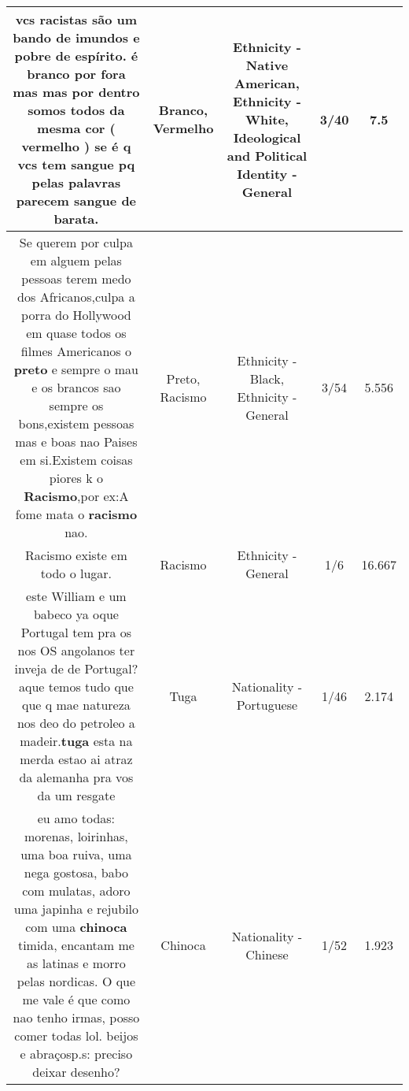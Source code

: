 \documentclass[11pt]{article}
\newlength\mylength
\begin{document}
\begin{center}
\begin{longtable}{|C{.65\mylength}|C{.30\mylength}|C{.12\mylength}|C{.12\mylength}|C{.12\mylength}|}
  \small vcs racistas são um bando de imundos e pobre de espírito. é \textbf{branco} por fora mas mas por dentro somos todos da mesma cor ( \textbf{v\textbf{ermelho}} ) se é q vcs tem sangue pq pelas palavras parecem sangue de barata.\normalsize   & Branco, Vermelho & Ethnicity - Native American, Ethnicity - White, Ideological and Political Identity - General & 3/40 & 7.5 \\  \hline
  \small Se querem por culpa em alguem pelas pessoas terem medo dos Africanos,culpa a porra do Hollywood em quase todos os filmes Americanos o \textbf{preto} e sempre o mau e os brancos sao sempre os bons,existem pessoas mas e boas nao Paises em si.Existem coisas piores k o \textbf{Racismo},por ex:A fome mata o \textbf{racismo} nao.\normalsize   & Preto, Racismo & Ethnicity - Black, Ethnicity - General & 3/54 & 5.556 \\  \hline
  \small Racismo existe em todo o lugar.\normalsize   & Racismo & Ethnicity - General & 1/6 & 16.667 \\  \hline
  \small este William e um babeco ya oque Portugal tem pra os nos OS angolanos ter inveja de de Portugal? aque temos tudo que que q mae natureza nos deo do petroleo a madeir.\textbf{tuga} esta na merda estao ai atraz da alemanha pra vos da um resgate\normalsize   & Tuga & Nationality - Portuguese & 1/46 & 2.174 \\  \hline
  \small eu amo todas: morenas, loirinhas, uma boa ruiva, uma nega gostosa, babo com mulatas, adoro uma japinha e rejubilo com uma \textbf{chinoca} timida, encantam me as latinas e morro pelas nordicas. O que me vale é que como nao tenho irmas, posso comer todas lol. beijos e abraçosp.s: preciso deixar desenho?\normalsize   & Chinoca & Nationality - Chinese & 1/52 & 1.923 \\  \hline

\end{longtable}
\end{center}
\end{document}
